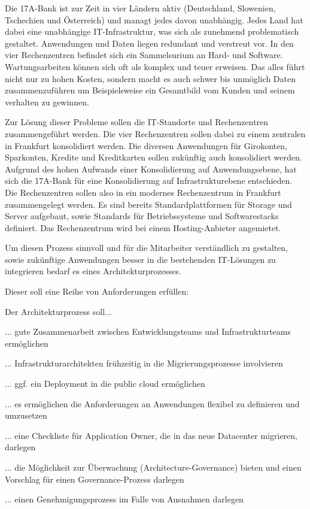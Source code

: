 Die 17A-Bank ist zur Zeit in vier Ländern aktiv (Deutschland, Slowenien, Tschechien und Österreich) und managt jedes davon unabhängig. Jedes Land hat dabei eine unabhängige IT-Infrastruktur, was sich als zunehmend problematisch gestaltet. Anwendungen und Daten liegen redundant und verstreut vor. In den vier Rechenzentren befindet sich ein Sammelsurium an Hard- und Software. Wartungsarbeiten können sich oft als komplex und teuer erweisen. Das alles führt nicht nur zu hohen Kosten, sondern macht es auch schwer bis unmöglich Daten zusammenzuführen um Beispielsweise ein Gesamtbild vom Kunden und seinem verhalten zu gewinnen. 

Zur Lösung dieser Probleme sollen die IT-Standorte und Rechenzentren zusammengeführt werden. Die vier Rechenzentren sollen dabei zu einem zentralen in Frankfurt konsolidiert werden. Die diversen Anwendungen für Girokonten, Sparkonten, Kredite und Kreditkarten sollen zukünftig auch konsolidiert werden. Aufgrund des hohen Aufwands einer Konsolidierung auf Anwendungsebene, hat sich die 17A-Bank für eine Konsolidierung auf Infrastrukturebene entschieden. Die Rechenzentren sollen also in ein modernes Rechenzentrum in Frankfurt zusammengelegt werden. Es sind bereits Standardplattformen für Storage und Server aufgebaut, sowie Standards für Betriebssysteme und Softwarestacks definiert. Das Rechenzentrum wird bei einem Hosting-Anbieter angemietet.

Um diesen Prozess sinnvoll und für die Mitarbeiter verständlich zu gestalten, sowie zukünftige Anwendungen besser in die bestehenden IT-Lösungen zu integrieren bedarf es eines Architekturprozesses.

Dieser soll eine Reihe von Anforderungen erfüllen:

Der Architekturprozess soll...

... gute Zusammenarbeit zwischen Entwicklungsteams und Infrastrukturteams ermöglichen

... Infrastrukturarchitekten frühzeitig in die Migrierungsprozesse involvieren

... ggf. ein Deployment in die public cloud ermöglichen

... es ermöglichen die Anforderungen an Anwendungen flexibel zu definieren und umzusetzen

... eine Checkliste für Application Owner, die in das neue Datacenter migrieren, darlegen

... die Möglichkeit zur Überwachung (Architecture-Governance) bieten und einen Vorschlag für einen Governance-Prozess darlegen

... einen Genehmigungsprozess im Falle von Ausnahmen darlegen

